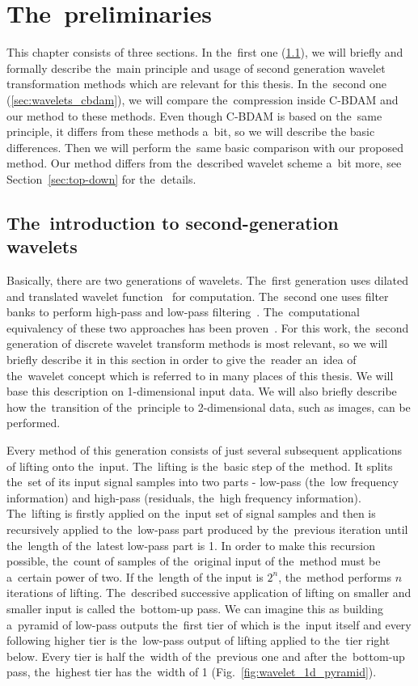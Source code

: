 \chapter{The~preliminaries}\label{chap:preliminaries}

This chapter consists of three sections. In the~first one (\ref{sec:wavelets}), we will briefly and formally describe the~main principle and usage of second generation wavelet transformation methods which are relevant for this thesis. In the~second one (\ref{sec:wavelets_cbdam}), we will compare the~compression inside C-BDAM and our method to these methods. Even though C-BDAM is based on the~same principle, it differs from these methods a~bit, so we will describe the basic differences. Then we will perform the~same basic comparison with our proposed method. Our method differs from the~described wavelet scheme a~bit more, see Section~\ref{sec:top-down} for the~details.

\section{The~introduction to second-generation wavelets}\label{sec:wavelets}
Basically, there are two generations of wavelets. The~first generation uses dilated and translated wavelet function~\cite{waveletsTutorial} for computation. The~second one uses filter banks to perform high-pass and low-pass filtering~\cite{waveletsLifting}. The~computational equivalency of these two approaches has been proven~\cite{waveletsEquiv}. For this work, the~second generation of discrete wavelet transform methods is most relevant, so we will briefly describe it in this section in order to give the~reader an~idea of the~wavelet concept which is referred to in many places of this thesis. We will base this description on 1-dimensional input data. We will also briefly describe how the~transition of the~principle to 2-dimensional data, such as images, can be performed.

Every method of this generation consists of just several subsequent applications of lifting onto the~input. The~lifting is the~basic step of the~method. It splits the~set of its input signal samples into two parts - low-pass (the~low frequency information) and high-pass (residuals, the~high frequency information). The~lifting is firstly applied on the~input set of signal samples and then is recursively applied to the~low-pass part produced by the~previous iteration until the~length of the~latest low-pass part is 1. In order to make this recursion possible, the~count of samples of the~original input of the~method must be a~certain power of two. If the~length of the input is $2^n$, the~method performs $n$ iterations of lifting. The~described successive application of lifting on smaller and smaller input is called the~bottom-up pass. We can imagine this as building a~pyramid of low-pass outputs the~first tier of which is the~input itself and every following higher tier is the~low-pass output of lifting applied to the~tier right below. Every tier is half the~width of the~previous one and after the~bottom-up pass, the~highest tier has the~width of 1 (Fig.~\ref{fig:wavelet_1d_pyramid}).

